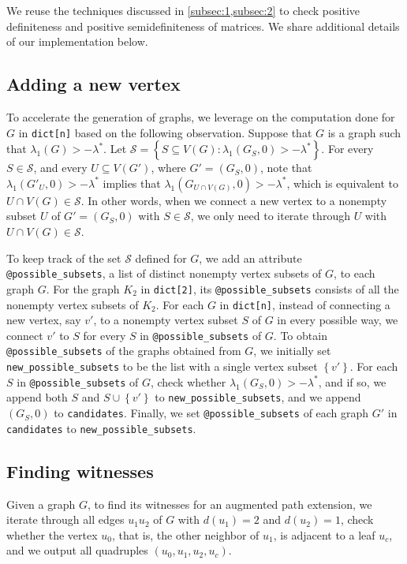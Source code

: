 \documentclass[11pt]{article}
\theoremstyle{definition}
\theoremstyle{remark}
\newcommand{\dset}[2]{\left\{{#1}\colon{#2}\right\}}
\newcommand{\sset}[1]{\left\{{#1}\right\}}
\newcommand{\la}{\lambda}
\newcommand{\las}{\lambda^*}
\begin{document}
We reuse the techniques discussed in \cref{subsec:1,subsec:2} to check positive definiteness and positive semidefiniteness of matrices. We share additional details of our implementation below.

\subsection{Adding a new vertex} \label{subsec:6}

To accelerate the generation of graphs, we leverage on the computation done for $G$ in \texttt{dict[n]} based on the following observation. Suppose that $G$ is a graph such that $\la_1(G) > -\las$. Let $\mathcal{S} = \dset{S \subseteq V(G)}{\la_1(G_S, 0) > -\las}$. For every $S \in \mathcal{S}$, and every $U \subseteq V(G')$, where $G' = (G_S, 0)$, note that $\la_1(G'_U, 0) > -\las$ implies that $\la_1(G_{U \cap V(G)}, 0) > -\las$, which is equivalent to $U \cap V(G) \in \mathcal{S}$. In other words, when we connect a new vertex to a nonempty subset $U$ of $G' = (G_S, 0)$ with $S \in \mathcal{S}$, we only need to iterate through $U$ with $U \cap V(G) \in \mathcal{S}$.

To keep track of the set $\mathcal{S}$ defined for $G$, we add an attribute \texttt{@possible\_subsets}, a list of distinct nonempty vertex subsets of $G$, to each graph $G$. For the graph $K_2$ in \texttt{dict[2]}, its \texttt{@possible\_subsets} consists of all the nonempty vertex subsets of $K_2$. For each $G$ in \texttt{dict[n]}, instead of connecting a new vertex, say $v'$, to a nonempty vertex subset $S$ of $G$ in every possible way, we connect $v'$ to $S$ for every $S$ in \texttt{@possible\_subsets} of $G$. To obtain \texttt{@possible\_subsets} of the graphs obtained from $G$, we initially set \texttt{new\_possible\_subsets} to be the list with a single vertex subset $\sset{v'}$. For each $S$ in \texttt{@possible\_subsets} of $G$, check whether $\la_1(G_S, 0) > -\las$, and if so, we append both $S$ and $S \cup \sset{v'}$ to \texttt{new\_possible\_subsets}, and we append $(G_S, 0)$ to \texttt{candidates}. Finally, we set \texttt{@possible\_subsets} of each graph $G'$ in \texttt{candidates} to \texttt{new\_possible\_subsets}.

\subsection{Finding witnesses} \label{subsec:5}

Given a graph $G$, to find its witnesses for an augmented path extension, we iterate through all edges $u_1u_2$ of $G$ with $d(u_1) = 2$ and $d(u_2) = 1$, check whether the vertex $u_0$, that is, the other neighbor of $u_1$, is adjacent to a leaf $u_c$, and we output all quadruples $(u_0, u_1, u_2, u_c)$.
\end{document}

